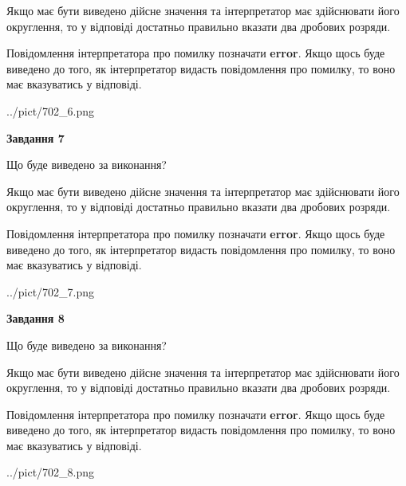 \documentclass[12pt, ukrainian]{article}
\begin{document}
{\begin {Large}
Якщо має бути виведено дійсне значення та інтерпретатор має здійснювати його округлення, 
то у відповіді достатньо правильно вказати два дробових розряди.

Повідомлення інтерпретатора про помилку позначати \textbf{error}.
Якщо щось буде виведено до того, як інтерпретатор видасть повідомлення про помилку, 
то воно має вказуватись у відповіді. \par

\begin{center}
	{../pict/702_6.png}
\end{center}
\newpage

{\begin {center}\textbf{Завдання 7}\end {center}}\par
Що буде виведено за виконання? \par

Якщо має бути виведено дійсне значення та інтерпретатор має здійснювати його округлення, 
то у відповіді достатньо правильно вказати два дробових розряди.

Повідомлення інтерпретатора про помилку позначати \textbf{error}.
Якщо щось буде виведено до того, як інтерпретатор видасть повідомлення про помилку, 
то воно має вказуватись у відповіді. \par

\begin{center}
	{../pict/702_7.png}
\end{center}
\newpage

{\begin {center}\textbf{Завдання 8}\end {center}}\par
Що буде виведено за виконання? \par

Якщо має бути виведено дійсне значення та інтерпретатор має здійснювати його округлення, 
то у відповіді достатньо правильно вказати два дробових розряди.

Повідомлення інтерпретатора про помилку позначати \textbf{error}.
Якщо щось буде виведено до того, як інтерпретатор видасть повідомлення про помилку, 
то воно має вказуватись у відповіді. \par

\begin{center}
	{../pict/702_8.png}
\end{center}
\newpage


\end{Large}}
\end{document}
